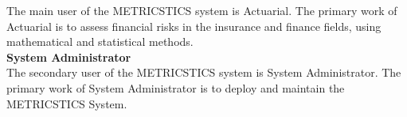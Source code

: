 The main user of the METRICSTICS system is Actuarial. The primary work of Actuarial is to assess financial risks in the insurance and finance fields, using mathematical and statistical methods.\\

\textbf{System Administrator}\\

The secondary user of the METRICSTICS system is System Administrator. The primary work of System Administrator is to deploy and maintain the METRICSTICS System.\\






